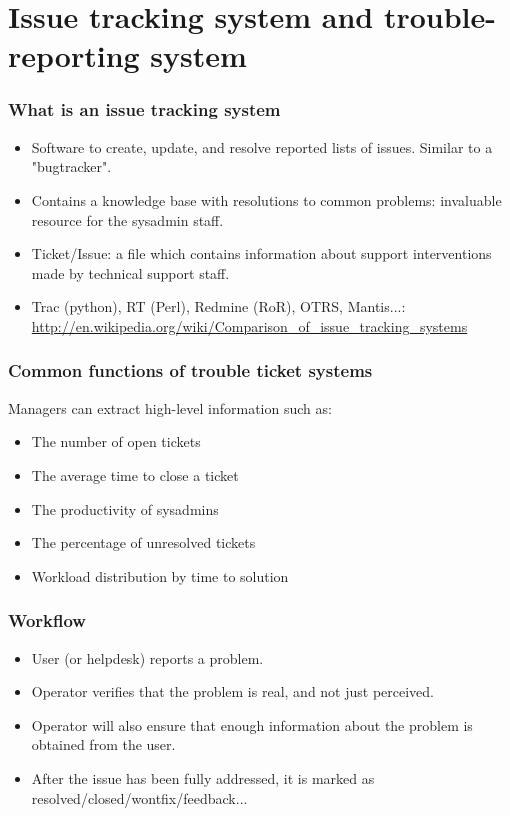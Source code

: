 \documentclass{beamer}
\begin{document}
\section{Issue tracking system and trouble-reporting system}


\begin{frame}
\frametitle{What is an issue tracking system}

\begin{itemize}
\item Software to create, update, and resolve reported lists of issues. Similar to a "bugtracker".
\item Contains a knowledge base with resolutions to common problems: invaluable resource for the sysadmin staff.
\item Ticket/Issue: a file which contains information about support interventions made by technical support staff.
\item Trac (python), RT (Perl), Redmine (RoR), OTRS, Mantis...: \url{http://en.wikipedia.org/wiki/Comparison_of_issue_tracking_systems}

\end{itemize}
\end{frame}



\begin{frame}
\frametitle{Common functions of trouble ticket systems}

Managers can extract high-level information such as:
\begin{itemize}
\item The number of open tickets
\item The average time to close a ticket
\item The productivity of sysadmins
\item The percentage of unresolved tickets
\item Workload distribution by time to solution

\end{itemize}
\end{frame}



\begin{frame}
\frametitle{Workflow}

\begin{itemize}
\item User (or helpdesk) reports a problem.
\item Operator verifies that the problem is real, and not just perceived. 
\item Operator will also ensure that enough information about the problem is obtained from the user.
\item After the issue has been fully addressed, it is marked as resolved/closed/wontfix/feedback...

\end{itemize}
\end{frame}
\end{document}
